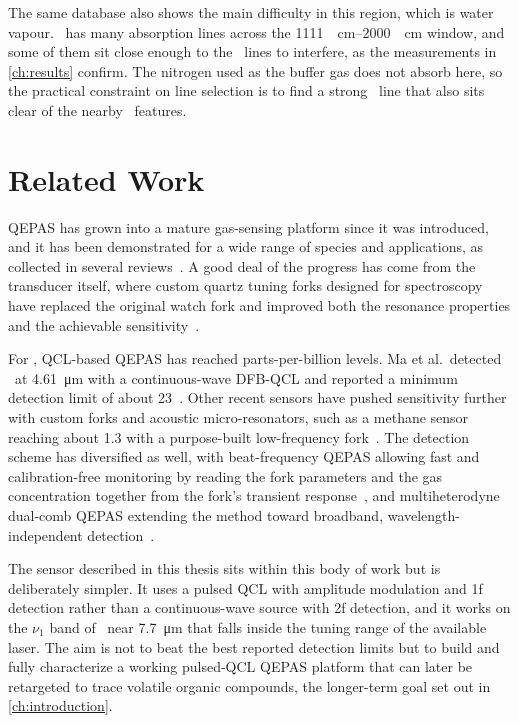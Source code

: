 The same database also shows the main difficulty in this region, which is water vapour. \water\ has many absorption lines across the \SIrange{1111}{2000}{\per\centi\meter} window, and some of them sit close enough to the \nto\ lines to interfere, as the measurements in \cref{ch:results} confirm. The nitrogen used as the buffer gas does not absorb here, so the practical constraint on line selection is to find a strong \nto\ line that also sits clear of the nearby \water\ features.

\section{Related Work}
\label{sec:related}

QEPAS has grown into a mature gas-sensing platform since it was introduced, and it has been demonstrated for a wide range of species and applications, as collected in several reviews~\cite{patimisco2014, sampaolo2022}. A good deal of the progress has come from the transducer itself, where custom quartz tuning forks designed for spectroscopy have replaced the original watch fork and improved both the resonance properties and the achievable sensitivity~\cite{lin2023}.

For \nto, QCL-based QEPAS has reached parts-per-billion levels. Ma et al.\ detected \nto\ at \SI{4.61}{\micro\meter} with a continuous-wave DFB-QCL and reported a minimum detection limit of about \SI{23}{\ppb}~\cite{ma2013}. Other recent sensors have pushed sensitivity further with custom forks and acoustic micro-resonators, such as a methane sensor reaching about \SI{1.3}{\ppb} with a purpose-built low-frequency fork~\cite{chen2025}. The detection scheme has diversified as well, with beat-frequency QEPAS allowing fast and calibration-free monitoring by reading the fork parameters and the gas concentration together from the fork's transient response~\cite{wu2017}, and multiheterodyne dual-comb QEPAS extending the method toward broadband, wavelength-independent detection~\cite{wang2024}.

The sensor described in this thesis sits within this body of work but is deliberately simpler. It uses a pulsed QCL with amplitude modulation and 1f detection rather than a continuous-wave source with 2f detection, and it works on the $\nu_1$ band of \nto\ near \SI{7.7}{\micro\meter} that falls inside the tuning range of the available laser. The aim is not to beat the best reported detection limits but to build and fully characterize a working pulsed-QCL QEPAS platform that can later be retargeted to trace volatile organic compounds, the longer-term goal set out in \cref{ch:introduction}.

